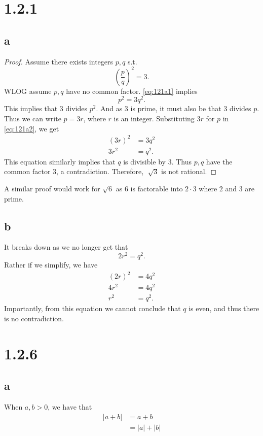 \documentclass[10pt]{article}
\begin{document}
\section*{1.2.1}
\subsection*{a}
\begin{proof}
    Assume there exists integers $p,q$ s.t.
    \begin{equation} \label{eq:121a1}
        \left (\frac{p}{q} \right )^2 = 3.
    \end{equation}
    WLOG assume $p,q$ have no common factor.
    \eqref{eq:121a1} implies
    \begin{equation} \label{eq:121a2}
        p^2 = 3q^2.
    \end{equation}
    This implies that $3$ divides $p^2$. And as $3$ is prime, it must also be that $3$ divides $p$. Thus we can write $p=3r$, where $r$ is an integer. Substituting $3r$ for $p$ in \eqref{eq:121a2}, we get
    \begin{align*}
        (3r)^2 &= 3q^2\\
        3r^2 &= q^2.
    \end{align*}
    This equation similarly implies that $q$ is divisible by $3$. Thus $p,q$ have the common factor $3$, a contradiction. Therefore, $\sqrt[]{3}$ is not rational.
\end{proof}

\noindent
A similar proof would work for $\sqrt{6}$ as $6$ is factorable into $2\cdot 3$ where $2$ and $3$ are prime.

\subsection*{b}
It breaks down as we no longer get that
\[2r^2 = q^2.\]
Rather if we simplify, we have
\begin{align*}
    (2r)^2 &= 4q^2\\
    4r^2 &= 4 q^2\\
    r^2 &= q^2.
\end{align*}
Importantly, from this equation we cannot conclude that $q$ is even, and thus there is no contradiction.

\section*{1.2.6}
\subsection*{a}
When $a,b > 0$, we have that
\begin{align*}
    |a + b| &= a + b\\
    &= |a| + |b|
\end{align*}
\end{document}
